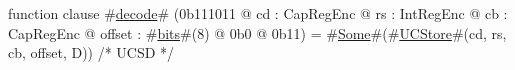 function clause #\hyperref[zdecode]{decode}# (0b111011 @ cd : CapRegEnc @ rs : IntRegEnc @ cb : CapRegEnc @ offset : #\hyperref[zbits]{bits}#(8) @ 0b0 @ 0b11) = #\hyperref[zSome]{Some}#(#\hyperref[zUCStore]{UCStore}#(cd, rs, cb, offset, D)) /* UCSD */
